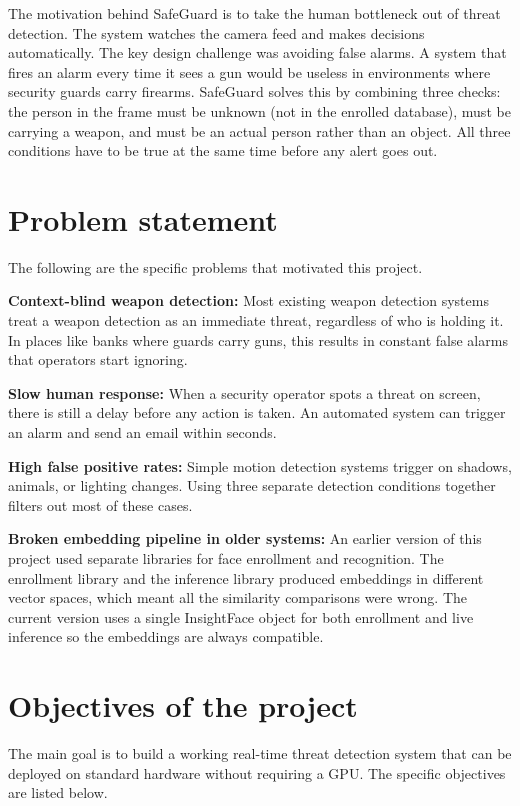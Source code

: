 \documentclass[12pt,a4paper]{report}
\begin{document}
The motivation behind SafeGuard is to take the human bottleneck out of threat detection. The system watches the camera feed and makes decisions automatically. The key design challenge was avoiding false alarms. A system that fires an alarm every time it sees a gun would be useless in environments where security guards carry firearms. SafeGuard solves this by combining three checks: the person in the frame must be unknown (not in the enrolled database), must be carrying a weapon, and must be an actual person rather than an object. All three conditions have to be true at the same time before any alert goes out.

\section{Problem statement}

The following are the specific problems that motivated this project.

\textbf{Context-blind weapon detection:} Most existing weapon detection systems treat a weapon detection as an immediate threat, regardless of who is holding it. In places like banks where guards carry guns, this results in constant false alarms that operators start ignoring.

\textbf{Slow human response:} When a security operator spots a threat on screen, there is still a delay before any action is taken. An automated system can trigger an alarm and send an email within seconds.

\textbf{High false positive rates:} Simple motion detection systems trigger on shadows, animals, or lighting changes. Using three separate detection conditions together filters out most of these cases.

\textbf{Broken embedding pipeline in older systems:} An earlier version of this project used separate libraries for face enrollment and recognition. The enrollment library and the inference library produced embeddings in different vector spaces, which meant all the similarity comparisons were wrong. The current version uses a single InsightFace object for both enrollment and live inference so the embeddings are always compatible.

\section{Objectives of the project}

The main goal is to build a working real-time threat detection system that can be deployed on standard hardware without requiring a GPU. The specific objectives are listed below.
\end{document}
